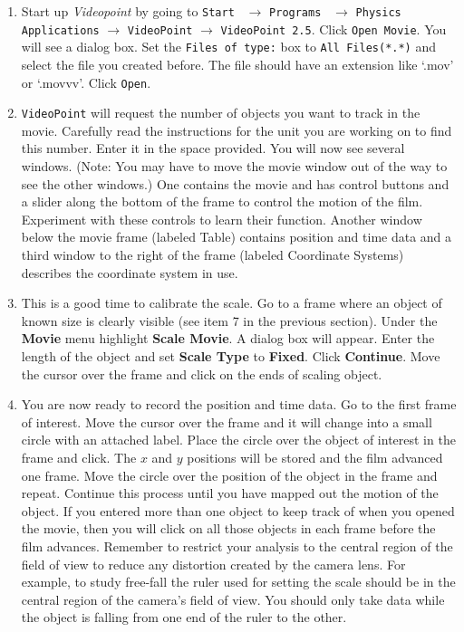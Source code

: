 \begin{enumerate}

\item Start up {\it Videopoint} by
going to {\tt Start } $\rightarrow$ {\tt Programs } $\rightarrow$
{\tt Physics Applications} $\rightarrow$ 
{\tt VideoPoint}
$\rightarrow$ {\tt VideoPoint 2.5}.
Click {\tt Open Movie}. You will see a dialog box. Set the {\tt Files of type:}
box to {\tt All Files(*.*)} and select the file you created before.
The file should have an extension like `.mov' or `.movvv'.
Click {\tt Open}.

\item {\tt VideoPoint} will request the number of objects you want to
track in the movie. Carefully read the instructions for the unit you
are working on to find this number. Enter it in the space provided.
You will now see several windows. 
(Note: You may have to move the movie window out of the way to see the
other windows.) One contains the movie and has control
buttons and a slider along the bottom of the frame to control the
motion of the film. Experiment with these controls to learn their
function. Another window below the movie frame (labeled Table) contains position 
and time data and a third window to the right of the frame (labeled Coordinate
Systems) describes the coordinate system in use.

\item This is a good time to calibrate the scale. Go to a frame where an
object of known size is clearly visible (see item 7
in the previous
section). Under the \textbf{Movie} menu highlight \textbf{Scale Movie}.
A dialog box will appear. Enter the length of the object and set \textbf{Scale
Type} to \textbf{Fixed}. Click \textbf{Continue}. Move the cursor
over the frame and click on the ends of scaling object.

\item You are now ready to record the position and time data. Go to the
first frame of interest. Move the cursor over the frame and it will
change into a small circle with an attached label. Place the circle
over the object of interest in the frame and click. The $x$ and $y$ positions
will be stored and the film advanced one frame. Move the circle over
the position of the object in the frame and repeat. Continue this
process until you have mapped out the motion of the object. If you
entered more than one object to keep track of when you opened the
movie, then you will click on all those objects in each frame before
the film advances.
Remember to restrict your analysis to the central region of the field of view to
reduce any distortion created by the camera lens.
For example, to study free-fall the ruler used for setting the scale should be in the
central region of the camera's field of view. You should only take data while the object is falling from one
end of the ruler to the other.


\end{enumerate}
